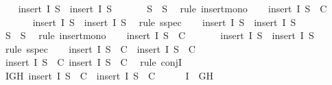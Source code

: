 \begin{isabellebody}
\ \ \isamarkupfalse%
\ {\isachardoublequoteopen}insert\ I\ S{}\ {\isasymsubseteq}\ insert\ I\ {\isacharquery}S{\isachardoublequoteclose}\ \isanewline
\ \ \ \ \isamarkupfalse%
\ {\isacartoucheopen}S{}\ {\isasymsubseteq}\ {\isacharquery}S{\isacartoucheclose}\ \isamarkupfalse%
\ {\isacharparenleft}rule\ insert{\isacharunderscore}mono{\isacharparenright}\isanewline
\ \ \isamarkupfalse%
\ {\isachardoublequoteopen}insert\ I\ S{}\ {\isasymin}\ C{\isachardoublequoteclose}\isanewline
\ \ \ \ \isamarkupfalse%
\ {}\ {\isacartoucheopen}insert\ I\ S{}\ {\isasymsubseteq}\ insert\ I\ {\isacharquery}S{\isacartoucheclose}\ \isamarkupfalse%
\ {\isacharparenleft}rule\ sspec{\isacharparenright}\isanewline
\ \ \isamarkupfalse%
\ {\isachardoublequoteopen}insert\ I\ S{}\ {\isasymsubseteq}\ insert\ I\ {\isacharquery}S{\isachardoublequoteclose}\isanewline
\ \ \ \ \isamarkupfalse%
\ {\isacartoucheopen}S{}\ {\isasymsubseteq}\ {\isacharquery}S{\isacartoucheclose}\ \isamarkupfalse%
\ {\isacharparenleft}rule\ insert{\isacharunderscore}mono{\isacharparenright}\isanewline
\ \ \isamarkupfalse%
\ {\isachardoublequoteopen}insert\ I\ S{}\ {\isasymin}\ C{\isachardoublequoteclose}\isanewline
\ \ \ \ \isamarkupfalse%
\ {}\ {\isacartoucheopen}insert\ I\ S{}\ {\isasymsubseteq}\ insert\ I\ {\isacharquery}S{\isacartoucheclose}\ \isamarkupfalse%
\ {\isacharparenleft}rule\ sspec{\isacharparenright}\isanewline
\ \ \isamarkupfalse%
\ {\isachardoublequoteopen}insert\ I\ S{}\ {\isasymin}\ C\ {\isasymand}\ insert\ I\ S{}\ {\isasymin}\ C{\isachardoublequoteclose}\isanewline
\ \ \ \ \isamarkupfalse%
\ {\isacartoucheopen}insert\ I\ S{}\ {\isasymin}\ C{\isacartoucheclose}\ {\isacartoucheopen}insert\ I\ S{}\ {\isasymin}\ C{\isacartoucheclose}\ \isamarkupfalse%
\ {\isacharparenleft}rule\ conjI{\isacharparenright}\isanewline
\ \ \isamarkupfalse%
\ {\isachardoublequoteopen}{\isasymexists}I{\isasymin}{\isacharbraceleft}G{\isacharcomma}H{\isacharbraceright}{\isachardot}\ insert\ I\ S{}\ {\isasymin}\ C\ {\isasymand}\ insert\ I\ S{}\ {\isasymin}\ C{\isachardoublequoteclose}\isanewline
\ \ \ \ \isamarkupfalse%
\ {\isacartoucheopen}I\ {\isasymin}\ {\isacharbraceleft}G{\isacharcomma}H{\isacharbraceright}{\isacartoucheclose}\ \isamarkupfalse%

\end{isabellebody}
